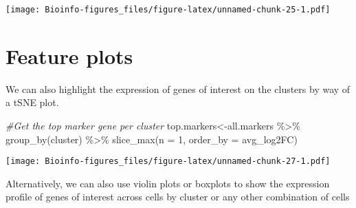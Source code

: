 \documentclass[
  openany]{book}
\newenvironment{Shaded}{\begin{snugshade}}{\end{snugshade}}
\newcommand{\AttributeTok}[1]{\textcolor[rgb]{0.77,0.63,0.00}{#1}}
\newcommand{\CommentTok}[1]{\textcolor[rgb]{0.56,0.35,0.01}{\textit{#1}}}
\newcommand{\DecValTok}[1]{\textcolor[rgb]{0.00,0.00,0.81}{#1}}
\newcommand{\FunctionTok}[1]{\textcolor[rgb]{0.00,0.00,0.00}{#1}}
\newcommand{\NormalTok}[1]{#1}
\newcommand{\OtherTok}[1]{\textcolor[rgb]{0.56,0.35,0.01}{#1}}
\newcommand{\SpecialCharTok}[1]{\textcolor[rgb]{0.00,0.00,0.00}{#1}}
\newcommand{\StringTok}[1]{\textcolor[rgb]{0.31,0.60,0.02}{#1}}
\begin{document}
\texttt{[image: Bioinfo-figures\_files/figure-latex/unnamed-chunk-25-1.pdf]}

\clearpage

\hypertarget{feature-plots}{%
\section{Feature plots}\label{feature-plots}}

We can also highlight the expression of genes of interest on the clusters by way of a tSNE plot.

\begin{Shaded}
\begin{Highlighting}[]
\CommentTok{\#Get the top marker gene per cluster}
\NormalTok{top.markers}\OtherTok{\textless{}{-}}\NormalTok{all.markers }\SpecialCharTok{\%\textgreater{}\%}
    \FunctionTok{group\_by}\NormalTok{(cluster) }\SpecialCharTok{\%\textgreater{}\%}
    \FunctionTok{slice\_max}\NormalTok{(}\AttributeTok{n =} \DecValTok{1}\NormalTok{, }\AttributeTok{order\_by =}\NormalTok{ avg\_log2FC)}
\end{Highlighting}
\end{Shaded}

\begin{Shaded}
\end{Shaded}

\texttt{[image: Bioinfo-figures\_files/figure-latex/unnamed-chunk-27-1.pdf]}

Alternatively, we can also use violin plots or boxplots to show the expression profile of genes of interest across cells by cluster or any other combination of cells

\begin{Shaded}
\end{Shaded}
\end{document}

